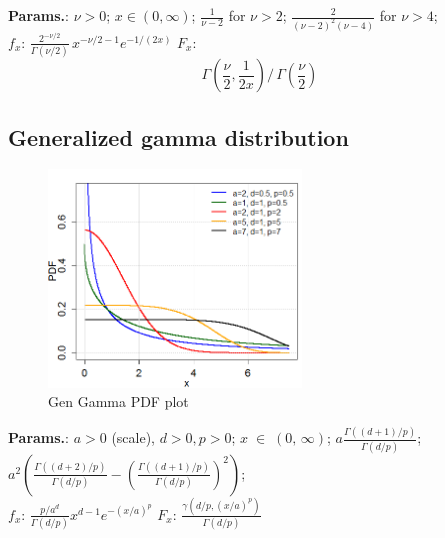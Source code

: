     {\color{darkblue} \textbf{Params.}:} {$\nu > 0\!$}; {$x \in (0, \infty)\!$}; {$\frac{1}{\nu-2}\!$ for $\nu >2\!$}; {$\frac{2}{(\nu-2)^2 (\nu-4)}\!$ for $\nu >4\!$};\hspace{0.5cm}\\{\color{darkblue} \textbf{$f_x$}:} {$\frac{2^{-\nu/2}}{\Gamma(\nu/2)}\,x^{-\nu/2-1}  e^{-1/(2 x)}\!$}{\color{darkblue} \textbf{$F_x$}:} {$$\Gamma\!\left(\frac{\nu}{2},\frac{1}{2x}\right)
\bigg/\, \Gamma\!\left(\frac{\nu}{2}\right)\!$$}



    
        
\subsection{Generalized gamma distribution}


    \begin{figure}[H]
        \centering
        \includegraphics[width=0.6\textwidth]{images/GenGamma.png}
        \caption{Gen Gamma PDF plot}
    \end{figure}




    {\color{darkblue} \textbf{Params.}:} {$a>0$ (scale), $d>0, p>0$}; {$x \;\in\; (0,\, \infty)$}; {$a \frac{\Gamma((d+1)/p)}{\Gamma(d/p)}$}; {$a^2\left(\frac{\Gamma((d+2)/p)}{\Gamma(d/p)} - \left(\frac{\Gamma((d+1)/p)}{\Gamma(d/p)}\right)^2\right)$};\hspace{0.5cm}\\{\color{darkblue} \textbf{$f_x$}:} {$\frac{p/a^d}{\Gamma(d/p)} x^{d-1}e^{-(x/a)^p}$}{\color{darkblue} \textbf{$F_x$}:} {$\frac{\gamma(d/p, (x/a)^p)}{\Gamma(d/p)}$}



